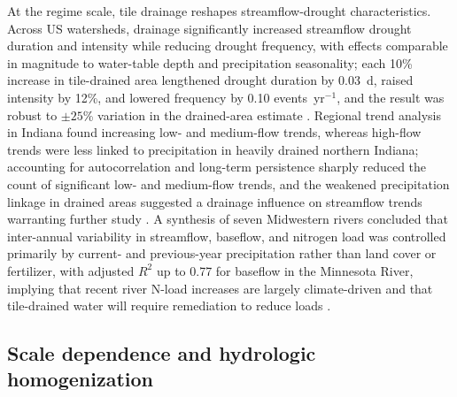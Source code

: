 \documentclass[11pt]{article}
\begin{document}
At the regime scale, tile drainage reshapes streamflow-drought characteristics. Across US watersheds, drainage significantly increased streamflow drought duration and intensity while reducing drought frequency, with effects comparable in magnitude to water-table depth and precipitation seasonality; each 10\% increase in tile-drained area lengthened drought duration by 0.03~d, raised intensity by 12\%, and lowered frequency by 0.10 events~yr$^{-1}$, and the result was robust to $\pm25$\% variation in the drained-area estimate \parencite{Adelsperger2024}. Regional trend analysis in Indiana found increasing low- and medium-flow trends, whereas high-flow trends were less linked to precipitation in heavily drained northern Indiana; accounting for autocorrelation and long-term persistence sharply reduced the count of significant low- and medium-flow trends, and the weakened precipitation linkage in drained areas suggested a drainage influence on streamflow trends warranting further study \parencite{Kumar2009}. A synthesis of seven Midwestern rivers concluded that inter-annual variability in streamflow, baseflow, and nitrogen load was controlled primarily by current- and previous-year precipitation rather than land cover or fertilizer, with adjusted $R^2$ up to 0.77 for baseflow in the Minnesota River, implying that recent river N-load increases are largely climate-driven and that tile-drained water will require remediation to reduce loads \parencite{Baeumler2020}.

\subsection{Scale dependence and hydrologic homogenization}
\end{document}
